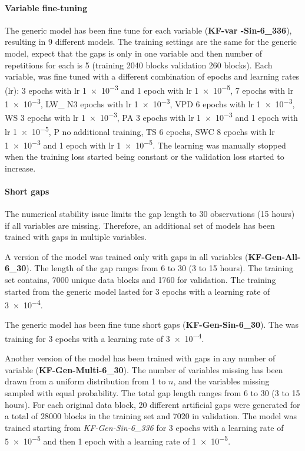 \documentclass{article}
\begin{document}
\paragraph{Variable fine-tuning} The generic model has been fine tune for each variable (\textbf{KF-\textlangle var \textrangle-Sin-6\_336}), resulting in 9 different models. The training settings are the same for the generic model, expect that the gaps is only in one variable and then number of repetitions for each is 5 (training 2040 blocks validation 260 blocks). Each variable, was fine tuned with a different combination of epochs and learning rates (lr):  3 epochs with lr \num{1e-3} and 1 epoch with lr \num{1e-5},  \num{7} epochs with lr \num{1e-3}, LW\_ N\num{3} epochs with lr \num{1e-3}, VPD \num{6} epochs with lr \num{1e-3}, WS \num{3} epochs with lr \num{1e-3}, PA \num{3} epochs with lr \num{1e-3} and 1 epoch with lr \num{1e-5}, P no additional training, TS \num{6} epochs, SWC \num{8} epochs with lr \num{1e-3} and 1 epoch with lr \num{1e-5}. The learning was manually stopped when the training loss started being constant or the validation loss started to increase.

\paragraph{Short gaps} The numerical stability issue limits the gap length to 30 observations (15 hours) if all variables are missing. Therefore, an additional set of models has been trained with gaps in multiple variables.  

A version of the model was trained only with gaps in all variables (\textbf{KF-Gen-All-6\_30}). The length of the gap ranges from 6 to 30 (3 to 15 hours). The training set contains, 7000 unique data blocks and 1760 for validation. The training started from the generic model lasted for 3 epochs with a learning rate of \num{3e-4}.

The generic model has been fine tune short gaps (\textbf{KF-Gen-Sin-6\_30}). The was training for 3 epochs with a learning rate of \num{3e-4}.

Another version of the model has been trained with gaps in any number of variable (\textbf{KF-Gen-Multi-6\_30}). The number of variables missing has been drawn from a uniform distribution  from 1 to $n$, and the variables missing sampled with equal probability. The total gap length ranges from 6 to 30 (3 to 15 hours). For each original data block, 20 different artificial gaps were generated for a total of 28000 blocks in the training set and 7020 in validation. The model was trained starting from \textit{KF-Gen-Sin-6\_336} for 3 epochs with a learning rate of \num{5e-5} and then 1 epoch with a learning rate of \num{1e-5}.
\end{document}
